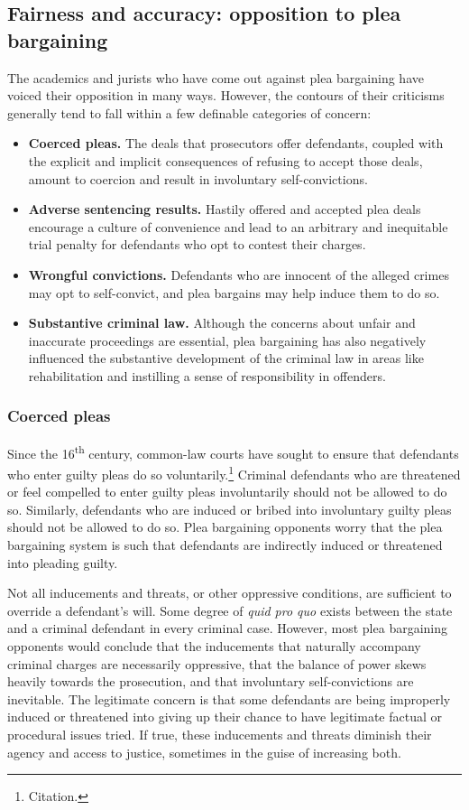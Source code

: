 \subsection{Fairness and accuracy: opposition to plea bargaining}

The academics and jurists who have come out against plea bargaining have voiced their opposition in many ways. However, the contours of their criticisms generally tend to fall within a few definable categories of concern:

\begin{itemize}
\item \textbf{Coerced pleas.} The deals that prosecutors offer defendants, coupled with the explicit and implicit consequences of refusing to accept those deals, amount to coercion and result in involuntary self-convictions.
\item \textbf{Adverse sentencing results.} Hastily offered and accepted plea deals encourage a culture of convenience and lead to an arbitrary and inequitable trial penalty for defendants who opt to contest their charges.
\item \textbf{Wrongful convictions.} Defendants who are innocent of the alleged crimes may opt to self-convict, and plea bargains may help induce them to do so.
\item \textbf{Substantive criminal law.} Although the concerns about unfair and inaccurate proceedings are essential, plea bargaining has also negatively influenced the substantive development of the criminal law in areas like rehabilitation and instilling a sense of responsibility in offenders. 
\end{itemize}

\subsubsection{Coerced pleas}

Since the 16\textsuperscript{th} century, common-law courts have sought to ensure that defendants who enter guilty pleas do so voluntarily.\footnote{Citation.} Criminal defendants who are threatened or feel compelled to enter guilty pleas involuntarily should not be allowed to do so. Similarly, defendants who are induced or bribed into involuntary guilty pleas should not be allowed to do so. Plea bargaining opponents worry that the plea bargaining system is such that defendants are indirectly induced or threatened into pleading guilty. 

Not all inducements and threats, or other oppressive conditions, are sufficient to override a defendant's will. Some degree of \textit{quid pro quo} exists between the state and a criminal defendant in every criminal case. However, most plea bargaining opponents would conclude that the inducements that naturally accompany criminal charges are necessarily oppressive, that the balance of power skews heavily towards the prosecution, and that involuntary self-convictions are inevitable. The legitimate concern is that some defendants are being improperly induced or threatened into giving up their chance to have legitimate factual or procedural issues tried. If true, these inducements and threats diminish their agency and access to justice, sometimes in the guise of increasing both. 

